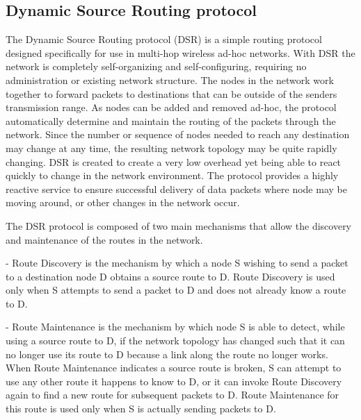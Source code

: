 \subsection{Dynamic Source Routing protocol}
The Dynamic Source Routing protocol (DSR) is a simple routing protocol designed specifically for use in multi-hop wireless ad-hoc networks.
With DSR the network is completely self-organizing and self-configuring, requiring no administration or existing network structure.
The nodes in the network work together to forward packets to destinations that can be outside of the senders transmission range.
As nodes can be added and removed ad-hoc, the protocol automatically determine and maintain the routing of the packets through the network.
Since the number or sequence of nodes needed to reach any destination may change at any time, the resulting network topology may be quite rapidly changing.
DSR is created to create a very low overhead yet being able to react quickly to change in the network environment.
The protocol provides a highly reactive service to ensure successful delivery of data packets where node may be moving around, or other changes in the network occur\cite{DSR}. 

The DSR protocol is composed of two main mechanisms that allow the discovery and maintenance of the routes in the network.

- Route Discovery is the mechanism by which a node S wishing to send a packet to a destination node D obtains a source route to D.
Route Discovery is used only when S attempts to send a packet to D and does not already know a route to D.

- Route Maintenance is the mechanism by which node S is able to detect, while using a source route to D, if the network topology has changed such that it can no longer use its route to D because a link along the route no longer works.
When Route Maintenance indicates a source route is broken, S can attempt to use any other route it happens to know to D, or it can invoke Route Discovery again to find a new route for subsequent packets to D.
Route Maintenance for this route is used only when S is actually sending packets to D.

